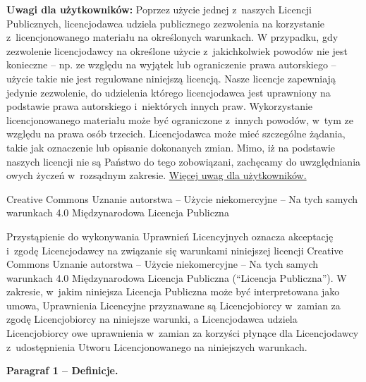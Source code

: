 \documentclass[oneside,polish,11pt,rmheadings]{mwbk}
\begin{document}
\textbf{{\textmd{Uwagi dla użytkowników:}}}{ Poprzez użycie jednej z~naszych Licencji Publicznych, licencjodawca udziela publicznego zezwolenia na korzystanie z~licencjonowanego materiału na określonych warunkach. W przypadku, gdy zezwolenie licencjodawcy na określone użycie z~jakichkolwiek powodów nie jest konieczne – np. ze względu na wyjątek lub ograniczenie prawa autorskiego – użycie takie nie jest regulowane niniejszą licencją. Nasze licencje zapewniają jedynie zezwolenie, do udzielenia którego licencjodawca jest uprawniony na podstawie prawa autorskiego i~niektórych innych praw. Wykorzystanie licencjonowanego materiału może być ograniczone z~innych powodów, w~tym ze względu na prawa osób trzecich. Licencjodawca może mieć szczególne żądania, takie jak oznaczenie lub opisanie dokonanych zmian. Mimo, iż na podstawie naszych licencji nie są Państwo do tego zobowiązani, zachęcamy do uwzględniania owych życzeń w~rozsądnym zakresie. }\href{https://wiki.creativecommons.org/Considerations_for_licensors_and_licensees#Considerations_for_licensees}{Więcej uwag dla użytkowników.}

\bigskip
Creative Commons Uznanie autorstwa -- Użycie niekomercyjne -- Na tych samych warunkach 4.0 Międzynarodowa Licencja Publiczna 
\bigskip

Przystąpienie do wykonywania Uprawnień Licencyjnych oznacza akceptację i~zgodę Licencjodawcy na związanie się warunkami niniejszej licencji Creative Commons Uznanie autorstwa -- Użycie niekomercyjne -- Na tych samych warunkach 4.0 Międzynarodowa Licencja Publiczna (“Licencja Publiczna”). W zakresie, w~jakim niniejsza Licencja Publiczna może być interpretowana jako umowa, Uprawnienia Licencyjne przyznawane są Licencjobiorcy w~zamian za zgodę Licencjobiorcy na niniejsze warunki, a Licencjodawca udziela Licencjobiorcy owe uprawnienia w~zamian za korzyści płynące dla Licencjodawcy z~udostępnienia Utworu Licencjonowanego na niniejszych warunkach. 

\textbf{Paragraf 1 – Definicje.} 
\end{document}
